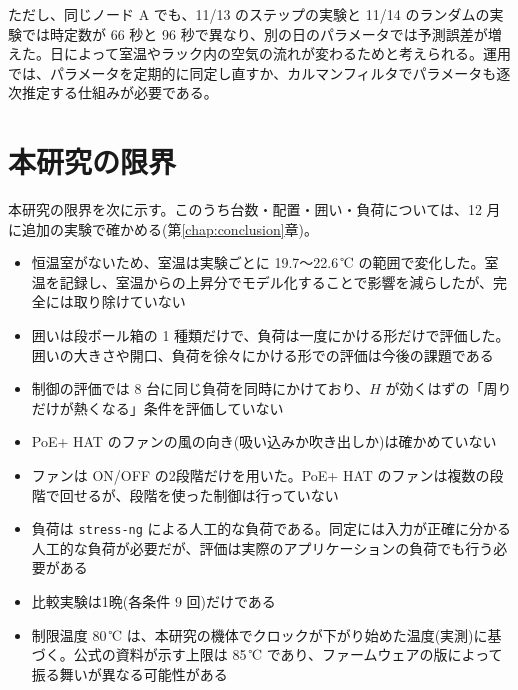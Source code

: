 ただし、同じノード A でも、11/13 のステップの実験と 11/14 のランダムの実験では時定数が 66 秒と 96 秒で異なり、別の日のパラメータでは予測誤差が増えた。日によって室温やラック内の空気の流れが変わるためと考えられる。運用では、パラメータを定期的に同定し直すか、カルマンフィルタでパラメータも逐次推定する仕組みが必要である。

\section{本研究の限界}\label{sec:disc-limits}
本研究の限界を次に示す。このうち台数・配置・囲い・負荷については、12 月に追加の実験で確かめる(第\ref{chap:conclusion}章)。

\begin{itemize}
  \item 恒温室がないため、室温は実験ごとに 19.7〜22.6\,℃ の範囲で変化した。室温を記録し、室温からの上昇分でモデル化することで影響を減らしたが、完全には取り除けていない
  \item 囲いは段ボール箱の 1 種類だけで、負荷は一度にかける形だけで評価した。囲いの大きさや開口、負荷を徐々にかける形での評価は今後の課題である
  \item 制御の評価では 8 台に同じ負荷を同時にかけており、$H$ が効くはずの「周りだけが熱くなる」条件を評価していない
  \item PoE+ HAT のファンの風の向き(吸い込みか吹き出しか)は確かめていない
  \item ファンは ON/OFF の2段階だけを用いた。PoE+ HAT のファンは複数の段階で回せるが、段階を使った制御は行っていない
  \item 負荷は \texttt{stress-ng} による人工的な負荷である。同定には入力が正確に分かる人工的な負荷が必要だが、評価は実際のアプリケーションの負荷でも行う必要がある
  \item 比較実験は1晩(各条件 9 回)だけである
  \item 制限温度 80\,℃ は、本研究の機体でクロックが下がり始めた温度(実測)に基づく。公式の資料が示す上限は 85\,℃ であり\cite{rpi2026cooling}、ファームウェアの版によって振る舞いが異なる可能性がある
\end{itemize}
